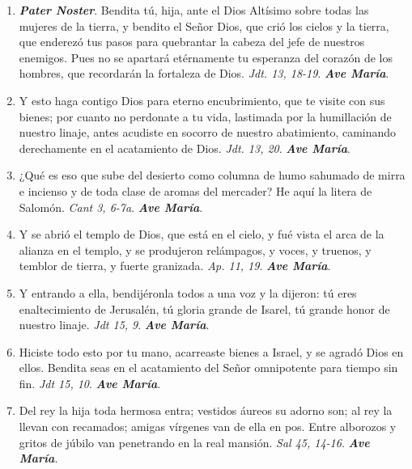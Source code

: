 \documentclass[../../devocionario.tex]{subfiles}
\begin{document}
    \begin{enumerate}
    
        \item \textbf{\emph{Pater Noster}}. Bendita tú, hija, ante el Dios Altísimo sobre todas las mujeres de la tierra,
            y bendito el Señor Dios, que crió los cielos y la tierra, que enderezó tus pasos para quebrantar la cabeza del jefe 
            de nuestros enemigos. Pues no se apartará etérnamente tu esperanza del corazón de los hombres, que recordarán la fortaleza de Dios. 
            \emph{Jdt. 13, 18-19}. \textbf{\emph{Ave María}}.

        \item Y esto haga contigo Dios para eterno encubrimiento, que te visite con sus bienes; por cuanto no perdonate a tu vida, 
            lastimada por la humillación de nuestro linaje, antes acudiste en socorro de nuestro abatimiento, 
            caminando derechamente en el acatamiento de Dios. \emph{Jdt. 13, 20}. \textbf{\emph{Ave María}}.

        \item ¿Qué es eso que sube del desierto como columna de humo sahumado de mirra e incienso y de toda clase de aromas del mercader? 
            He aquí la litera de Salomón. \emph{Cant 3, 6-7a}. \textbf{\emph{Ave María}}.

        \item Y se abrió el templo de Dios, que está en el cielo, y fué vista el arca de la alianza en el templo, y se produjeron relámpagos, y voces, y truenos, 
            y temblor de tierra, y fuerte granizada. \emph{Ap. 11, 19}. \textbf{\emph{Ave María}}.

        \item Y entrando a ella, bendijéronla todos a una voz y la dijeron: tú eres enaltecimiento de Jerusalén, tú gloria grande de Isarel, tú grande honor de nuestro linaje. 
            \emph{Jdt 15, 9}. \textbf{\emph{Ave María}}.

        \item Hiciste todo esto por tu mano, acarreaste bienes a Israel, y se agradó Dios en ellos. Bendita seas en el acatamiento del Señor omnipotente para tiempo sin fin. 
            \emph{Jdt 15, 10}. \textbf{\emph{Ave María}}.

        \item Del rey la hija toda hermosa entra; vestidos áureos su adorno son; al rey la llevan con recamados; amigas vírgenes van de ella en pos. 
            Entre alborozos y gritos de júbilo van penetrando en la real mansión. \emph{Sal 45, 14-16}. \textbf{\emph{Ave María}}.


\end{enumerate}
\end{document}
